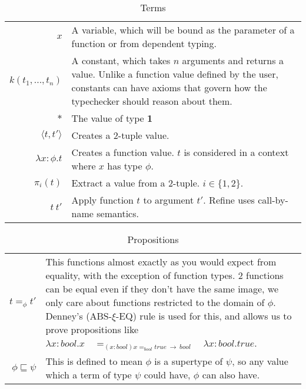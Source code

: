 \begin{table}
    \begin{tabular}{|r|p{}|}
        \hline
        $x$ &
        A variable, which will be bound as the parameter of a function or from dependent typing.\\\cline{1-2}
        $k(t_1, ..., t_n)$ &
        A constant, which takes $n$ arguments and returns a value.
        Unlike a function value defined by the user, constants can have axioms that govern how the typechecker
        should reason about them.\\\cline{1-2}
        $\ast$ &
        The value of type \textbf{1}\\\cline{1-2}
        $\langle t, t' \rangle$ &
        Creates a 2-tuple value.\\\cline{1-2}
        $\lambda x: \phi . t$ &
        Creates a function value.
        $t$ is considered in a context where $x$ has type $\phi$.\\\cline{1-2}
        $\pi_i(t)$ &
        Extract a value from a 2-tuple. $i \in \{1, 2\}$.\\\cline{1-2}
        $t\ t'$ &
        Apply function $t$ to argument $t'$.
        Refine uses call-by-name semantics.\\\hline
    \end{tabular}
    \caption{Terms}
    \label{tab:terms}
\end{table}

\begin{table}
    \begin{tabular}{|r|p{}|}
        \hline
        $t =_\phi t'$ &
        This functions almost exactly as you would expect from equality, with the exception of function types.
        2 functions can be equal even if they don't have the same image, we only care about functions
        restricted to the domain of $\phi$.
        Denney's (ABS-$\xi$-EQ) rule is used for this, and allows us to prove propositions like\newline
        $\lambda x: bool . x \quad =_{(x:bool) x =_{bool} true\ \rightarrow\ bool} \quad \lambda x: bool . true$.
        \\\cline{1-2}
        $\phi \sqsubseteq \psi$ &
        This is defined to mean $\phi$ is a supertype of $\psi$,
        so any value which a term of type $\psi$ could have, $\phi$ can also have.\\\hline
    \end{tabular}
    \caption{Propositions}
    \label{tab:propositions}
\end{table}

